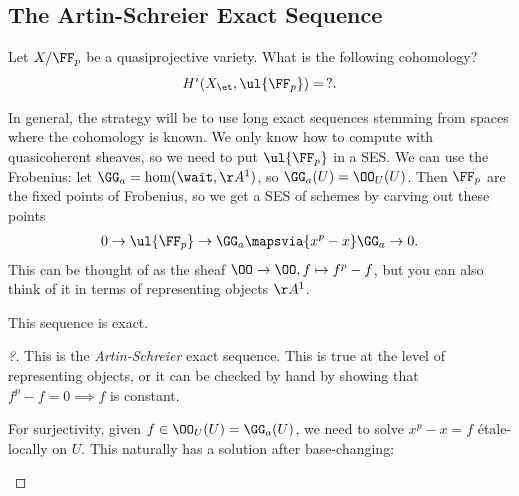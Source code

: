 \hypertarget{the-artin-schreier-exact-sequence}{%
\subsection{The Artin-Schreier Exact
Sequence}\label{the-artin-schreier-exact-sequence}}

\begin{example}[?]

Let \(X/\FF_p\) be a quasiprojective variety. What is the following
cohomology?
\begin{align*}  
H^i(X_\et, \ul{\FF_p})  = \, ?
.\end{align*}

In general, the strategy will be to use long exact sequences stemming
from spaces where the cohomology is known. We only know how to compute
with quasicoherent sheaves, so we need to put \(\ul{\FF_p}\) in a SES.
We can use the Frobenius: let \(\GG_a = \hom(\wait, \AA^1)\), so
\(\GG_a(U) = \OO_U(U)\). Then \(\FF_p\) are the fixed points of
Frobenius, so we get a SES of schemes by carving out these points
\begin{align*}  
0 \to
\ul{\FF_p} \to
\GG_a \mapsvia{x^p - x}
\GG_a \to 
0
.\end{align*} This can be thought of as the sheaf
\(\OO \to \OO, f \mapsto f^p -f\), but you can also think of it in terms
of representing objects \(\AA^1\).

\begin{claim}

This sequence is exact.

\end{claim}

\begin{proof}[?]

This is the \emph{Artin-Schreier} exact sequence. This is true at the
level of representing objects, or it can be checked by hand by showing
that \(f^p - f = 0 \implies f\) is constant.

For surjectivity, given \(f\in \OO_U(U) = \GG_a(U)\), we need to solve
\(x^p - x = f\) étale-locally on \(U\). This naturally has a solution
after base-changing:

\begin{center}
\end{center}


\end{proof}
\end{example}
